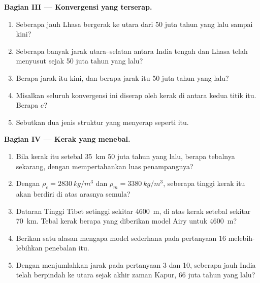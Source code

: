 \begin{problem}
\medskip
\noindent\textbf{Bagian III --- Konvergensi yang terserap.}
\begin{enumerate}[resume]
  \item Seberapa jauh Lhasa bergerak ke utara dari 50 juta tahun yang lalu
        sampai kini?
  \item Seberapa banyak jarak utara--selatan antara India tengah dan Lhasa
        telah menyusut sejak 50 juta tahun yang lalu?
  \item Berapa jarak itu kini, dan berapa jarak itu 50 juta tahun yang lalu?
  \item Misalkan seluruh konvergensi ini diserap oleh  kerak di
        antara kedua titik itu. Berapa  $e$?
  \item Sebutkan dua jenis struktur yang menyerap  seperti itu.
\end{enumerate}

\medskip
\noindent\textbf{Bagian IV --- Kerak yang menebal.}
\begin{enumerate}[resume]
  \item Bila kerak itu setebal \qty{35}{km} 50 juta tahun yang lalu, berapa
        tebalnya sekarang, dengan mempertahankan luas penampangnya?
  \item Dengan $\rho_c = \qty{2830}{kg/m^3}$ dan $\rho_m = \qty{3380}{kg/m^3}$,
        seberapa tinggi kerak itu akan berdiri di atas arasnya semula?
  \item Dataran Tinggi Tibet setinggi sekitar \qty{4600}{m}, di atas kerak
        setebal sekitar \qty{70}{km}. Tebal kerak berapa yang diberikan model
        Airy untuk \qty{4600}{m}?
  \item Berikan satu alasan mengapa model sederhana pada pertanyaan 16
        melebih-lebihkan penebalan itu.
  \item Dengan menjumlahkan jarak pada pertanyaan 3 dan 10, seberapa jauh India
        telah berpindah ke utara sejak akhir zaman Kapur, 66 juta tahun yang
        lalu?
\end{enumerate}
\end{problem}
